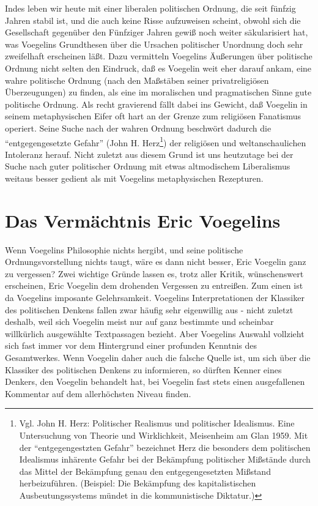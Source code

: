 Indes leben wir heute mit einer liberalen politischen Ordnung, die seit
fünfzig Jahren stabil ist, und die auch keine Risse aufzuweisen scheint,
obwohl sich die Gesellschaft gegenüber den Fünfziger Jahren gewiß noch
weiter säkularisiert hat, was Voegelins Grundthesen über die Ursachen
politischer Unordnung doch sehr zweifelhaft erscheinen läßt. Dazu
vermitteln Voegelins Äußerungen über politische Ordnung nicht selten den
Eindruck, daß es Voegelin weit eher darauf ankam, eine wahre politische
Ordnung (nach den Maßstäben seiner privatreligiösen Überzeugungen) zu
finden, als eine im moralischen und pragmatischen Sinne gute politische
Ordnung. Als recht gravierend fällt dabei ins Gewicht, daß Voegelin in
seinem metaphysischen Eifer oft hart an der Grenze zum religiösen
Fanatismus operiert. Seine Suche nach der wahren Ordnung beschwört
dadurch die "`entgegengesetzte Gefahr"' (John H.  Herz\footnote{Vgl.
  John H. Herz: Politischer Realismus und politischer Idealismus.  Eine
  Untersuchung von Theorie und Wirklichkeit, Meisenheim am Glan 1959.
  Mit der "`entgegengestzten Gefahr"' bezeichnet Herz die besonders dem
  politischen Idealismus inhärente Gefahr bei der Bekämpfung politischer
  Mißstände durch das Mittel der Bekämpfung genau den entgegengesetzten
  Mißstand herbeizuführen. (Beispiel: Die Bekämpfung des
  kapitalistischen Ausbeutungssystems mündet in die kommunistische
  Diktatur.)}) der religiösen und weltanschaulichen Intoleranz herauf.
Nicht zuletzt aus diesem Grund ist uns heutzutage bei der Suche nach
guter politischer Ordnung mit etwas altmodischem Liberalismus weitaus
besser gedient als mit Voegelins metaphysischen Rezepturen.

\section{Das Vermächtnis Eric Voegelins}

Wenn Voegelins Philosophie nichts hergibt, und seine politische
Ordnungsvorstellung nichts taugt, wäre es dann nicht besser, Eric Voegelin
ganz zu vergessen? Zwei wichtige Gründe lassen es, trotz aller Kritik,
wünschenswert erscheinen, Eric Voegelin dem drohenden Vergessen zu entreißen.
Zum einen ist da Voegelins imposante Gelehrsamkeit. Voegelins Interpretationen
der Klassiker des politischen Denkens fallen zwar häufig sehr eigenwillig aus
 - nicht zuletzt deshalb, weil sich Voegelin meist nur auf ganz bestimmte und
scheinbar willkürlich ausgewählte Textpassagen bezieht. Aber Voegelins Auswahl
vollzieht sich fast immer vor dem Hintergrund einer profunden Kenntnis des
Gesamtwerkes. Wenn Voegelin daher auch die falsche Quelle ist, um sich über
die Klassiker des politischen Denkens zu informieren, so dürften Kenner eines
Denkers, den Voegelin behandelt hat, bei Voegelin fast stets einen
ausgefallenen Kommentar auf dem allerhöchsten Niveau finden. 

